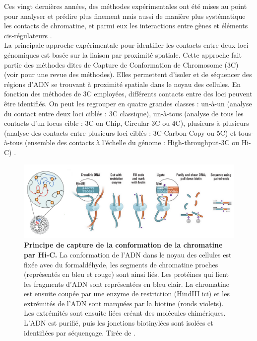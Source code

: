 Ces vingt dernières années, des méthodes expérimentales ont été mises au point pour analyser et prédire plus finement mais aussi de manière plus systématique les contacts de chromatine, et parmi eux les interactions entre gènes et éléments \gls{cis}-régulateurs \citep{dekker_capturing_2002, simonis_nuclear_2006, dostie_chromosome_2006, lieberman-aiden_comprehensive_2009,schoenfelder_pluripotent_2015}. \\

La principale approche expérimentale pour identifier les contacts entre deux loci génomiques est basée sur la liaison par proximité spatiale. Cette approche fait partie des méthodes dites de Capture de Conformation de Chromosome (\acrshort{3C}) (voir \citet{han_3c_2018} pour une revue des méthodes). Elles permettent d’isoler et de séquencer des régions d’ADN se trouvant à proximité spatiale dans le noyau des cellules. En fonction des méthodes de \acrshort{3C} employées, différents contacts entre des loci peuvent être identifiés. On peut les regrouper en quatre grandes classes : un-à-un (analyse du contact entre deux loci ciblés : \acrshort{3C} classique), un-à-tous (analyse de tous les contacts d’un locus cible : \acrshort{3C}-on-Chip, Circular-\acrshort{3C} ou 4C), plusieurs-à-plusieurs (analyse des contacts entre plusieurs loci ciblés : \acrshort{3C}-Carbon-Copy ou 5C) et tous-à-tous (ensemble des contacts à l’échelle du génome : High-throughput-\acrshort{3C} ou \acrshort{Hi-C}) \citep{han_3c_2018}.\\

\begin{figure}[h]
 \centering
 \includegraphics[width=1\textwidth, page=1] {figures/introduction/fig18.png}
 \caption[Principe de capture de la conformation de la chromatine par Hi-C.]{
 \textbf{Principe de capture de la conformation de la chromatine par Hi-C.}
 La conformation de l'ADN dans le noyau des cellules est fixée avec du formaldéhyde, les segments de chromatine proches (représentés en bleu et rouge) sont ainsi liés. Les protéines qui lient les fragments d'ADN sont représentées en bleu clair. La chromatine est ensuite coupée par une enzyme de restriction (HindIII ici) et les extrémités de l'ADN sont marquées par la biotine (ronds violets). Les extrémités sont ensuite liées créant des molécules chimériques. L'ADN est purifié, puis les jonctions biotinylées sont isolées et identifiées par séquençage. Tirée de \citet{lieberman-aiden_comprehensive_2009}.\\
 }
 \label{fig:Fig18}
\end{figure}

